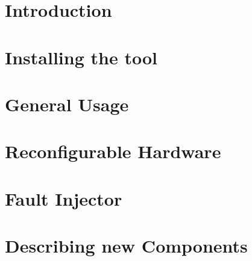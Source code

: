 \documentclass[a4paper,12pt,oneside]{book}
\begin{document}
\chapter{Introduction}
\label{intro}


\chapter{Installing the tool}
\label{install}


\chapter{General Usage}
\label{general}


\chapter{Reconfigurable Hardware}
\label{reconfigurable}


\chapter{Fault Injector}
\label{fault}


\chapter{Describing new Components}
\label{describe}


%

\appendix					%
\renewcommand{\chaptermark}[1]{\markboth{\MakeUppercase{\appendixname}\ \thechapter.\ #1}{}}

\backmatter					%

\small


\end{document}
